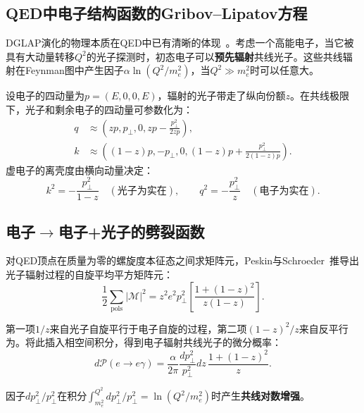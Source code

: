 \documentclass[12pt,a4paper]{ctexart}
\theoremstyle{definition}
\begin{document}
\subsection{QED中电子结构函数的Gribov--Lipatov方程}

DGLAP演化的物理本质在QED中已有清晰的体现~\cite{PeskinSchroeder1995}。考虑一个高能电子，当它被具有大动量转移$Q^2$的光子探测时，初态电子可以\textbf{预先辐射}共线光子。这些共线辐射在Feynman图中产生因子$\alpha \ln(Q^2/m_e^2)$，当$Q^2 \gg m_e^2$时可以任意大。

设电子的四动量为$p = (E, 0, 0, E)$，辐射的光子带走了纵向份额$z$。在共线极限下，光子和剩余电子的四动量可参数化为：
\begin{equation}
\begin{aligned}
q &\approx (zp, p_\perp, 0, zp - \tfrac{p_\perp^2}{2zp}), \\
k &\approx ((1-z)p, -p_\perp, 0, (1-z)p + \tfrac{p_\perp^2}{2(1-z)p}).
\end{aligned}
\label{eq:collinear_kinematics}
\end{equation}
虚电子的离壳度由横向动量决定：
\begin{equation}
k^2 = -\frac{p_\perp^2}{1-z} \quad (\text{光子为实在}), \qquad
q^2 = -\frac{p_\perp^2}{z} \quad (\text{电子为实在}).
\label{eq:virtuality}
\end{equation}

\subsection{电子$\to$电子+光子的劈裂函数}

对QED顶点在质量为零的螺旋度本征态之间求矩阵元，Peskin与Schroeder~\cite{PeskinSchroeder1995}推导出光子辐射过程的自旋平均平方矩阵元：
\begin{equation}
\frac{1}{2}\sum_{\text{pols}} |\mathcal{M}|^2 = z^2 e^2 p_\perp^2 \left[ \frac{1+(1-z)^2}{z(1-z)} \right].
\label{eq:electron_splitting_sq}
\end{equation}

第一项$1/z$来自光子自旋平行于电子自旋的过程，第二项$(1-z)^2/z$来自反平行为。将此插入相空间积分，得到电子辐射共线光子的微分概率：
\begin{equation}
d\mathcal{P}(e \to e\gamma) = \frac{\alpha}{2\pi} \frac{dp_\perp^2}{p_\perp^2} dz\, \frac{1+(1-z)^2}{z}.
\label{eq:collinear_prob}
\end{equation}

因子$dp_\perp^2/p_\perp^2$在积分$\int_{m_e^2}^{Q^2} dp_\perp^2/p_\perp^2 = \ln(Q^2/m_e^2)$时产生\textbf{共线对数增强}。
\end{document}
